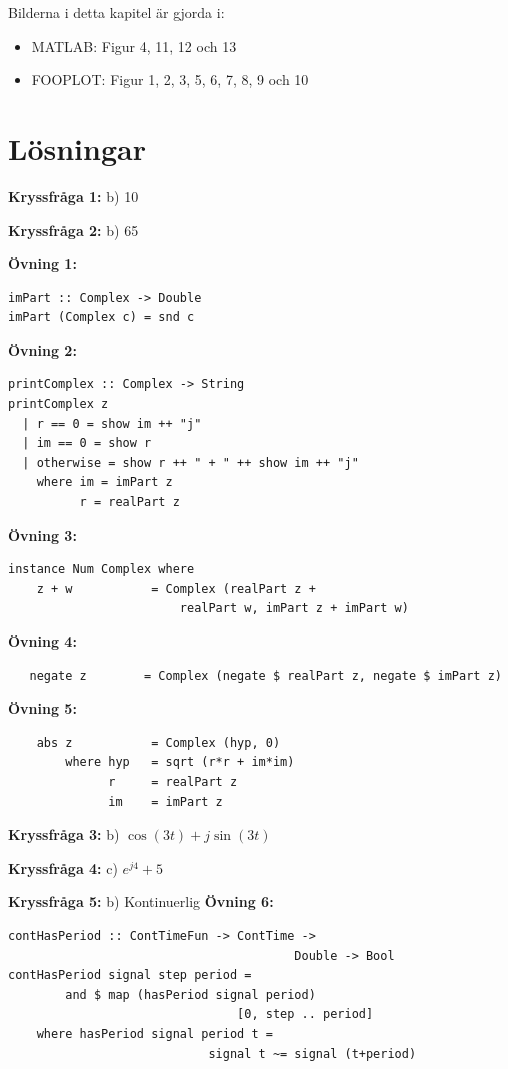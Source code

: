 \documentclass{article}
\begin{document}
Bilderna i detta kapitel är gjorda i:
\begin{itemize}
\item MATLAB: Figur 4, 11, 12 och 13
\item FOOPLOT: Figur 1, 2, 3, 5, 6, 7, 8, 9 och 10
\end{itemize}

\newpage
\section{Lösningar}

\textbf{Kryssfråga 1:} b) 10

\textbf{Kryssfråga 2:} b) 65

\textbf{Övning 1:}
\begin{verbatim}
imPart :: Complex -> Double
imPart (Complex c) = snd c
\end{verbatim}
\textbf{Övning 2:}
\begin{verbatim}
printComplex :: Complex -> String
printComplex z
  | r == 0 = show im ++ "j"
  | im == 0 = show r
  | otherwise = show r ++ " + " ++ show im ++ "j"
    where im = imPart z
          r = realPart z
\end{verbatim}
\textbf{Övning 3:}
\begin{verbatim}
instance Num Complex where
    z + w           = Complex (realPart z +
                        realPart w, imPart z + imPart w)
\end{verbatim}

\textbf{Övning 4:}
\begin{verbatim}
   negate z        = Complex (negate $ realPart z, negate $ imPart z)
\end{verbatim}

\textbf{Övning 5:}
\begin{verbatim}
    abs z           = Complex (hyp, 0)
        where hyp   = sqrt (r*r + im*im)
              r     = realPart z
              im    = imPart z
\end{verbatim}
\textbf{Kryssfråga 3:} b) $\cos(3t) + j\sin(3t)$

\textbf{Kryssfråga 4:} c) $e^{j4} + 5$

\textbf{Kryssfråga 5:} b) Kontinuerlig
\newline
\textbf{Övning 6:}
\begin{verbatim}
contHasPeriod :: ContTimeFun -> ContTime ->
                                        Double -> Bool
contHasPeriod signal step period =
        and $ map (hasPeriod signal period)
                                [0, step .. period]
    where hasPeriod signal period t =
                            signal t ~= signal (t+period)
\end{verbatim}
\end{document}
